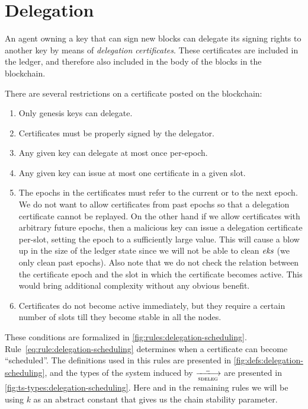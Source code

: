 \section{Delegation}
\label{sec:delegation}

An agent owning a key that can sign new blocks can delegate its signing rights
to another key by means of \textit{delegation certificates}. These certificates
are included in the ledger, and therefore also included in the body of the
blocks in the blockchain.

There are several restrictions on a certificate posted on the blockchain:
\begin{enumerate}
\item Only genesis keys can delegate.
\item Certificates must be properly signed by the delegator.
\item Any given key can delegate at most once per-epoch.
\item Any given key can issue at most one certificate in a given slot.
\item The epochs in the certificates must refer to the current or to the next
  epoch. We do not want to allow certificates from past epochs so that a
  delegation certificate cannot be replayed. On the other hand if we allow
  certificates with arbitrary future epochs, then a malicious key can issue a
  delegation certificate per-slot, setting the epoch to a sufficiently large
  value. This will cause a blow up in the size of the ledger state since we
  will not be able to clean $\mathit{eks}$ (we only clean past epochs). Also note
  that we do not check the relation between the certificate epoch and the slot
  in which the certificate becomes active. This would bring additional
  complexity without any obvious benefit.
\item Certificates do not become active immediately, but they require a certain
  number of slots till they become stable in all the nodes.
\end{enumerate}
These conditions are formalized in \cref{fig:rules:delegation-scheduling}.
Rule~\ref{eq:rule:delegation-scheduling} determines when a certificate can
become ``scheduled''. The definitions used in this rules are presented in
\cref{fig:defs:delegation-scheduling}, and the types of the system induced by
$\trans{sdeleg}{\wcard}$ are presented in
\cref{fig:ts-types:delegation-scheduling}. Here and in the remaining rules we
will be using $k$ as an abstract constant that gives us the chain stability
parameter.

